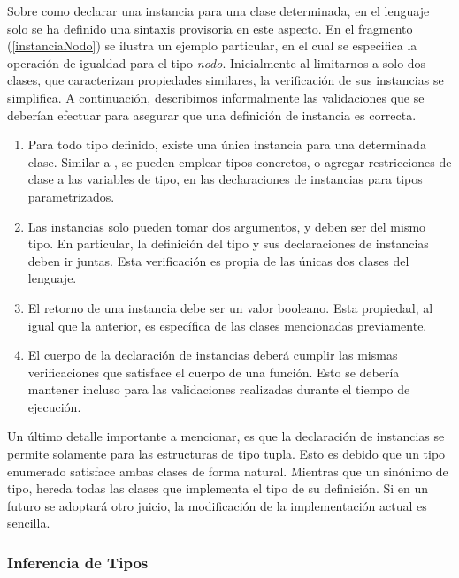 Sobre como declarar una instancia para una clase determinada, en el lenguaje solo se ha definido una sintaxis provisoria en este aspecto.
En el fragmento (\ref{instanciaNodo}) se ilustra un ejemplo particular, en el cual se especifica la operación de igualdad para el tipo \textit{nodo}.
Inicialmente al limitarnos a solo dos clases, que caracterizan propiedades similares, la verificación de sus instancias se simplifica.
A continuación, describimos informalmente las validaciones que se deberían efectuar para asegurar que una definición de instancia es correcta.

\begin{enumerate}
    \item Para todo tipo definido, existe una única instancia para una determinada clase.
    Similar a \Haskell{}, se pueden emplear tipos concretos, o agregar restricciones de clase a las variables de tipo, en las declaraciones de instancias para tipos parametrizados.
    \item Las instancias solo pueden tomar dos argumentos, y deben ser del mismo tipo.
    En particular, la definición del tipo y sus declaraciones de instancias deben ir juntas.
    Esta verificación es propia de las únicas dos clases del lenguaje.
    \item El retorno de una instancia debe ser un valor booleano.
    Esta propiedad, al igual que la anterior, es específica de las clases mencionadas previamente.
    \item El cuerpo de la declaración de instancias deberá cumplir las mismas verificaciones que satisface el cuerpo de una función.
    Esto se debería mantener incluso para las validaciones realizadas durante el tiempo de ejecución.
\end{enumerate}

Un último detalle importante a mencionar, es que la declaración de instancias se permite solamente para las estructuras de tipo tupla.
Esto es debido que un tipo enumerado satisface ambas clases de forma natural.
Mientras que un sinónimo de tipo, hereda todas las clases que implementa el tipo de su definición.
Si en un futuro se adoptará otro juicio, la modificación de la implementación actual es sencilla.

\subsubsection{Inferencia de Tipos}

